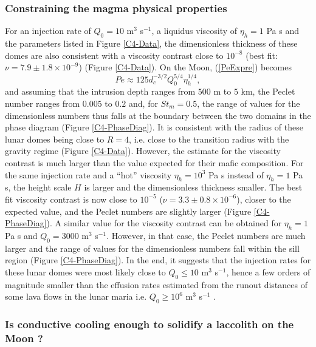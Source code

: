 \subsubsection*{Constraining the magma physical properties}
\label{sec:visc-contr-lunar}

For  an  injection  rate  of $Q_0=10$  m$^{3}$  s$^{-1}$,  a  liquidus
viscosity of  $\eta_h= 1$  Pa s  and the  parameters listed  in Figure
\ref{C4-Data},  the dimensionless  thickness of  these domes  are also
consistent with  a viscosity  contrast close  to $10^{-8}$  (best fit:
$\nu=7.9  \pm 1.8  \times  10^{-9}$) (Figure  \ref{C4-Data}).  On  the
Moon, (\ref{PeExpre}) becomes
\begin{equation}
  Pe \approx 125 d_c^{-3/2} Q_0^{5/4}\eta_h^{1/4},
  \label{PeExpreMoon}
\end{equation}
and assuming that  the intrusion depth ranges from $500$  m to $5$ km,
the Peclet  number ranges from  $0.005$ to $0.2$ and,  for $St_m=0.5$,
the range  of values for the  dimensionless numbers thus falls  at the
boundary  between  the  two  domains  in  the  phase  diagram  (Figure
\ref{C4-PhaseDiag}).  It is consistent with  the radius of these lunar
domes being close to $R=4$, i.e.   close to the transition radius with
the gravity regime (Figure  \ref{C4-Data}).  However, the estimate for
the  viscosity contrast  is much  larger than  the value  expected for
their mafic  composition.  For the  same injection rate and  a ``hot''
viscosity $\eta_h=10^3$  Pa s instead  of $\eta_h=1$ Pa s,  the height
scale $H$ is larger and  the dimensionless thickness smaller. The best
fit    viscosity    contrast    is     now    close    to    $10^{-5}$
($\nu = 3.3 \pm 0.8 \times10^{-6}$), closer to the expected value, and
the Peclet numbers are slightly larger (Figure \ref{C4-PhaseDiag}).  A
similar  value  for  the  viscosity   contrast  can  be  obtained  for
$\eta_h=1$ Pa s and $Q_0=3000$ m$^3$ s$^{-1}$.  However, in that case,
the Peclet  numbers are much  larger and the  range of values  for the
dimensionless   numbers   fall   within  the   sill   region   (Figure
\ref{C4-PhaseDiag}).  In the end, it suggests that the injection rates
for these  lunar domes were most  likely close to $Q_0\le  10$ m$^{3}$
s$^{-1}$, hence  a few orders  of magnitude smaller than  the effusion
rates estimated  from the runout distances  of some lava flows  in the
lunar     maria     i.e.      $Q_0\ge     10^6$     m$^3$     s$^{-1}$
\citep{TracyKPGregg:1996wp}.

\subsubsection*{Is conductive  cooling enough to solidify  a laccolith
  on the Moon ?}
\label{sec:visc-contr-lunar}


